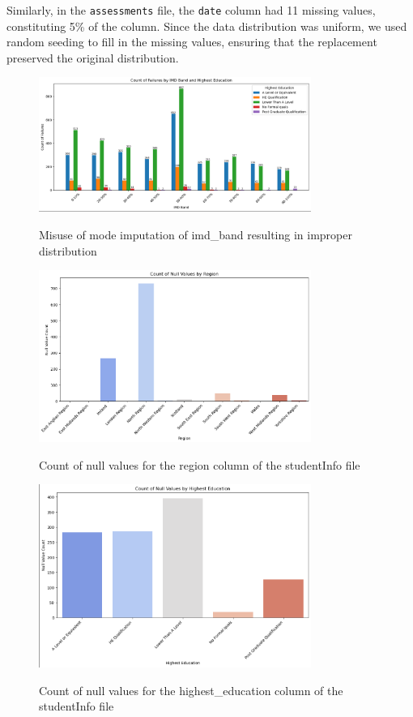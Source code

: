 Similarly, in the \texttt{assessments} file, the \texttt{date} column had 11 missing values, constituting 5\% of the column. Since the data distribution was uniform, we used random seeding to fill in the missing values, ensuring that the replacement preserved the original distribution.

\begin{figure}
  \begin{center}
  \includegraphics[width=3.5in]{photo/clusteredimd.PNG}\\
  \caption{Misuse of mode imputation of imd\_band resulting in improper distribution}
  \label{clutteredimd}
  \end{center}
\end{figure}

\begin{figure}
  \begin{center}
  \includegraphics[width=3.5in]{photo/ncr.PNG}\\
  \caption{Count of null values for the region column of the studentInfo file}
  \label{ncr}
  \end{center}
\end{figure}

\begin{figure}
  \begin{center}
  \includegraphics[width=3.5in]{photo/henc.PNG}\\
  \caption{Count of null values for the highest\_education column of the studentInfo file}
  \label{henc}
  \end{center}
\end{figure}

